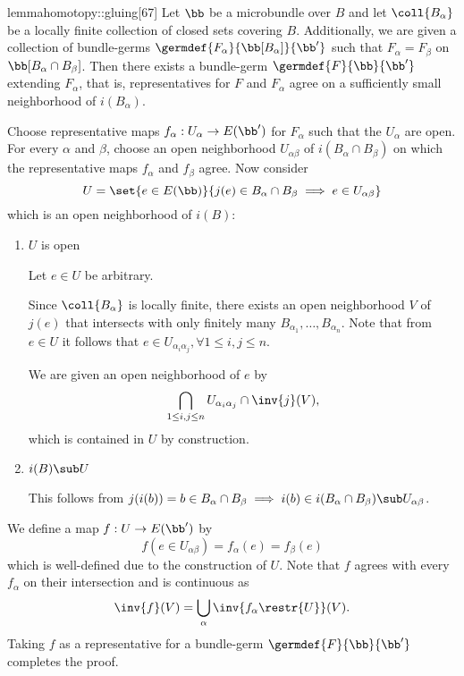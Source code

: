 
\begin{mystatement}{lemma}{homotopy::gluing}[67]
    Let $\bb$ be a microbundle over $B$ and let $\coll{B_\alpha}$
    be a locally finite collection of closed sets covering $B$.
    Additionally, we are given a collection
    of bundle-germs $\germdef{F_\alpha}{\bb[B_\alpha]}{\bb'}$
    such that $F_\alpha = F_\beta$ on $\bb[B_\alpha \cap B_\beta]$.
    Then there exists a bundle-germ $\germdef{F}{\bb}{\bb'}$ extending $F_\alpha$,
    that is, representatives for $F$ and $F_\alpha$ agree on a sufficiently small neighborhood of $i(B_\alpha)$.
\end{mystatement}

\begin{myproof}
    Choose representative maps $f_\alpha: U_\alpha \to E(\bb')$ for $F_\alpha$ such that the $U_\alpha$ are open.
    For every $\alpha$ and $\beta$, choose an open neighborhood $U_{\alpha\beta}$ of $i(B_\alpha \cap B_\beta)$ on which the representative maps $f_\alpha$ and $f_\beta$ agree.
    Now consider
    \[ U = \set{ e \in E(\bb)}{j(e) \in B_\alpha \cap B_\beta \implies e \in U_{\alpha\beta}} \]
    which is an open neighborhood of $i(B)$:
    \begin{enumerate}
        \item $U$ is open

        Let $e \in U$ be arbitrary.

        Since $\coll{B_\alpha}$ is locally finite,
        there exists an open neighborhood $V$ of $j(e)$
        that intersects with only finitely many $B_{\alpha_1}, \dots, B_{\alpha_n}$.
        Note that from $e \in U$ it follows that $e \in U_{\alpha_i\alpha_j}, \forall 1 \le i, j \le n$.

        We are given an open neighborhood of $e$ by
        \[ \bigcap_{1 \le i, j \le n} U_{\alpha_i\alpha_j} \cap \inv{j}(V), \]
        which is contained in $U$ by construction.

        \item $i(B) \sub U$
        
        This follows from
        $j(i(b)) = b \in B_\alpha \cap B_\beta \implies i(b) \in i(B_\alpha \cap B_\beta) \sub U_{\alpha\beta}$.
    \end{enumerate}
    We define a map $f: U \to E(\bb')$ by
    \[ f(e \in U_{\alpha\beta}) = f_\alpha(e) = f_\beta(e) \]
    which is well-defined due to the construction of $U$.
    Note that $f$ agrees with every $f_\alpha$ on their intersection
    and is continuous as
    \[ \inv{f}(V) = \bigcup_{\alpha} \inv{f_\alpha\restr{U}}(V). \]
    Taking $f$ as a representative for a bundle-germ $\germdef{F}{\bb}{\bb'}$
    completes the proof.
\end{myproof}
